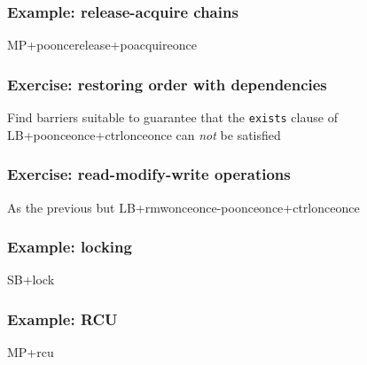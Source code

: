 \documentclass[usenames,dvipsnames]{beamer}
\begin{document}
\begin{frame}[fragile]
\frametitle{Example: release-acquire chains}

\begin{center}
MP+pooncerelease+poacquireonce
\end{center}

\end{frame}


\begin{frame}[fragile]
\frametitle{Exercise: restoring order with dependencies}

Find barriers suitable to guarantee that the \texttt{exists} clause of \\
LB+poonceonce+ctrlonceonce can \emph{not} be satisfied

\end{frame}


\begin{frame}[fragile]
\frametitle{Exercise: read-modify-write operations}

As the previous but LB+rmwonceonce-poonceonce+ctrlonceonce

\end{frame}


\begin{frame}[fragile]
\frametitle{Example: locking}

\begin{center}
SB+lock
\end{center}

\end{frame}


\begin{frame}[fragile]
\frametitle{Example: RCU}

\begin{center}
MP+rcu
\end{center}

\end{frame}
\end{document}
